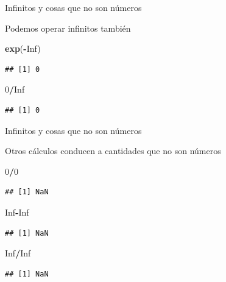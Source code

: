 \documentclass[ignorenonframetext,]{beamer}
\newenvironment{Shaded}{\begin{snugshade}}{\end{snugshade}}
\newcommand{\KeywordTok}[1]{\textcolor[rgb]{0.13,0.29,0.53}{\textbf{#1}}}
\newcommand{\DecValTok}[1]{\textcolor[rgb]{0.00,0.00,0.81}{#1}}
\newcommand{\OtherTok}[1]{\textcolor[rgb]{0.56,0.35,0.01}{#1}}
\newcommand{\OperatorTok}[1]{\textcolor[rgb]{0.81,0.36,0.00}{\textbf{#1}}}
\newcommand{\NormalTok}[1]{#1}
\begin{document}
\begin{frame}[fragile]{Infinitos y cosas que no son números}

Podemos operar infinitos también

\begin{Shaded}
\begin{Highlighting}[]
\KeywordTok{exp}\NormalTok{(}\OperatorTok{-}\OtherTok{Inf}\NormalTok{)}
\end{Highlighting}
\end{Shaded}

\begin{verbatim}
## [1] 0
\end{verbatim}

\begin{Shaded}
\begin{Highlighting}[]
\DecValTok{0}\OperatorTok{/}\OtherTok{Inf}
\end{Highlighting}
\end{Shaded}

\begin{verbatim}
## [1] 0
\end{verbatim}

\end{frame}

\begin{frame}[fragile]{Infinitos y cosas que no son números}

Otros cálculos conducen a cantidades que no son números

\begin{Shaded}
\begin{Highlighting}[]
\DecValTok{0}\OperatorTok{/}\DecValTok{0}
\end{Highlighting}
\end{Shaded}

\begin{verbatim}
## [1] NaN
\end{verbatim}

\begin{Shaded}
\begin{Highlighting}[]
\OtherTok{Inf}\OperatorTok{-}\OtherTok{Inf}
\end{Highlighting}
\end{Shaded}

\begin{verbatim}
## [1] NaN
\end{verbatim}

\begin{Shaded}
\begin{Highlighting}[]
\OtherTok{Inf}\OperatorTok{/}\OtherTok{Inf}
\end{Highlighting}
\end{Shaded}

\begin{verbatim}
## [1] NaN
\end{verbatim}

\end{frame}
\end{document}
